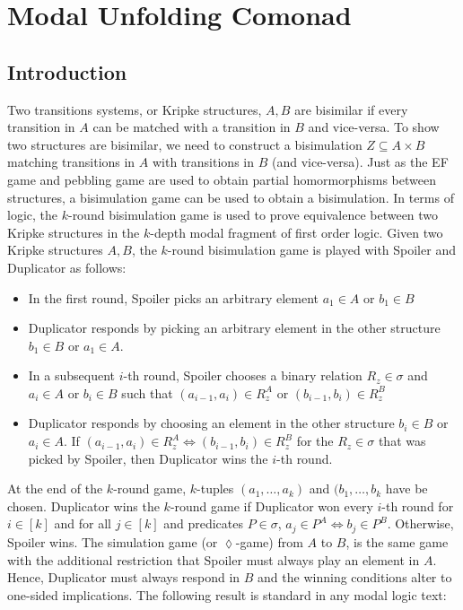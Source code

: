 \chapter{Modal Unfolding Comonad}
\section{Introduction}
Two transitions systems, or Kripke structures, $A,B$ are bisimilar if every transition in $A$ can be matched with a transition in $B$ and vice-versa. To show two structures are bisimilar, we need to construct a bisimulation $Z \subseteq A \times B$ matching transitions in $A$ with transitions in $B$ (and vice-versa). Just as the EF game and pebbling game are used to obtain partial homormorphisms between structures, a bisimulation game can be used to obtain a bisimulation. In terms of logic, the $k$-round bisimulation game is used to prove equivalence between two Kripke structures in the $k$-depth modal fragment of first order logic. Given two Kripke structures $A,B$, the $k$-round bisimulation game is played with Spoiler and Duplicator as follows: 
\begin{itemize} 
\item In the first round, Spoiler picks an arbitrary element $a_{1} \in A$ or $b_{1} \in B$
\item Duplicator responds by picking an arbitrary element in the other structure $b_{1} \in B$ or $a_{1} \in A$.
\item In a subsequent $i$-th round, Spoiler chooses a binary relation $R_{z} \in \sigma$ and $a_{i} \in A$ or $b_{i} \in B$ such that $(a_{i-1},a_{i}) \in R_{z}^{A}$ or $(b_{i-1},b_{i}) \in R_{z}^{B}$
\item Duplicator responds by choosing an element in the other structure $b_{i} \in B$ or $a_{i} \in A$. If $(a_{i-1},a_{i}) \in R_{z}^{A} \Leftrightarrow (b_{i-1},b_{i}) \in R_{z}^{B}$ for the $R_{z} \in \sigma$ that was picked by Spoiler, then Duplicator wins the $i$-th round.  
\end{itemize}
At the end of the $k$-round game, $k$-tuples $(a_{1},\dots,a_{k})$ and $(b_{1},\dots,b_{k}$ have be chosen. Duplicator wins the $k$-round game if Duplicator won every $i$-th round for $i \in [k]$ and for all $j \in [k]$ and predicates $P \in \sigma$, $a_{j} \in P^{A} \Leftrightarrow b_{j} \in P^{B}$. Otherwise, Spoiler wins. The simulation game (or $\lozenge$-game) from $A$ to $B$, is the same game with the additional restriction that Spoiler must always play an element in $A$. Hence, Duplicator must always respond in $B$ and the winning conditions alter to one-sided implications. The following result is standard in any modal logic text: 
